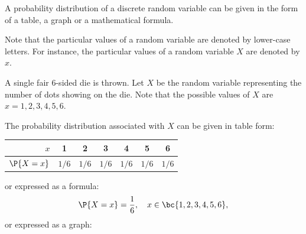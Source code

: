 A probability distribution of a discrete random variable can be given in the form of a table, a graph or a mathematical formula.

Note that the particular values of a random variable are denoted by lower-case letters. For instance, the particular values of a random variable $X$ are denoted by $x$.

\begin{example}
    A single fair 6-sided die is thrown. Let $X$ be the random variable representing the number of dots showing on the die. Note that the possible values of $X$ are $x = 1, 2, 3, 4, 5, 6$.

    The probability distribution associated with $X$ can be given in table form:
    \begin{center}
        \begin{tabular}{|r|c|c|c|c|c|c|}
            \hline
            $x$ & 1 & 2 & 3 & 4 & 5 & 6 \\ \hline
            $\P{X = x}$ & $1/6$ & $1/6$ & $1/6$ & $1/6$ & $1/6$ & $1/6$ \\ \hline
        \end{tabular}
    \end{center}
    or expressed as a formula: \[\P{X = x} = \frac16, \quad x \in \bc{1, 2, 3, 4, 5, 6},\] or expressed as a graph:
    \begin{center}
    \end{center}
\end{example}

